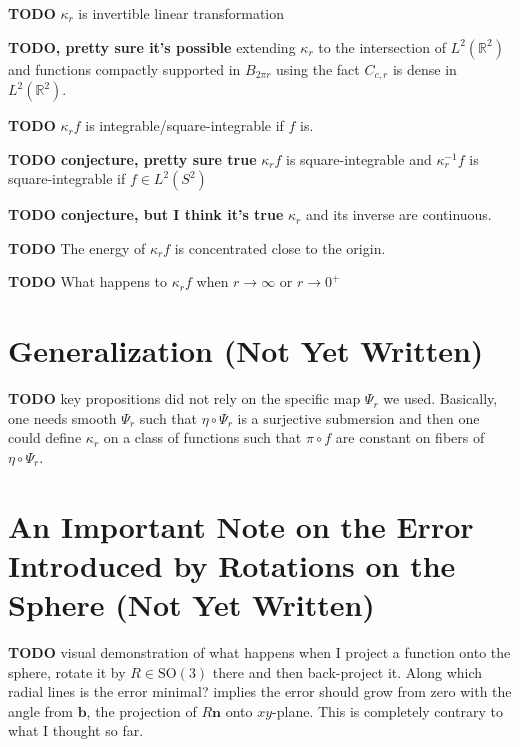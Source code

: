 \documentclass[a4paper,11pt]{scrartcl}
\numberwithin{dummy}{section}
\theoremstyle{plain}
\theoremstyle{plain}
\theoremstyle{plain}
\theoremstyle{plain}
\theoremstyle{nonumberplain}
\newcommand{\F}[1][R]{\mathbb{#1}} %
\newcommand{\SO}{\mathrm{SO}}
\begin{document}
	\textbf{TODO} $ \kappa_{r}  $ is invertible linear transformation
	
	\textbf{TODO, pretty sure it's possible} extending $ \kappa_{r} $ to the intersection of $ L^{2} (\F^{2}) $ and functions compactly supported in $ B_{2 \pi r} $ using the fact $ C_{c,r} $ is dense in $ L^{2} (\F^{2}) $.
	
	\textbf{TODO} $ \kappa_{r} f $ is integrable/square-integrable if $ f $ is.
	
	\textbf{TODO conjecture, pretty sure true} $ \kappa_{r} f $ is square-integrable and $ \kappa_{r}^{-1} f $ is square-integrable if $ f \in L^{2} (S^{2}) $
	
	\textbf{TODO conjecture, but I think it's true} $ \kappa_{r} $ and its inverse are continuous.
	
	\textbf{TODO} The energy of $ \kappa_{r} f $ is concentrated close to the origin.
	
	\textbf{TODO} What happens to $ \kappa_{r} f $ when $ r \to \infty $ or $ r \to 0^{+} $
	
	\section{Generalization (Not Yet Written)}
	\textbf{TODO} key propositions did not rely on the specific map $ \Psi_{r} $ we used. Basically, one needs smooth $ \Psi_{r} $ such that $ \eta \circ \Psi_{r} $ is a surjective submersion and then one could define $ \kappa_{r} $ on a class of functions such that $ \pi \circ f $ are constant on fibers of $ \eta \circ \Psi_{r} $.
	
	\appendix
	\section{An Important Note on the Error Introduced by Rotations on the Sphere (Not Yet Written)}
	\textbf{TODO} visual demonstration of what happens when I project a function onto the sphere, rotate it by $ R \in \SO(3) $ there and then back-project it. Along which radial lines is the error minimal?  implies the error should grow from zero with the angle from $ \mathbf{b} $, the projection of $ R \mathbf{n} $ onto $ xy $-plane. This is completely contrary to what I thought so far.
	
	\printbibliography
	
\end{document}
